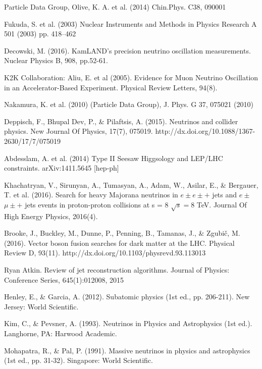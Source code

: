 \documentclass[11pt, oneside]{book}
\begin{document}
\begin{thebibliography}{10}

Particle Data Group, Olive, K. A. et al. (2014) Chin.Phys. C38, 090001 


 Fukuda, S. et al. (2003) Nuclear Instruments and Methods in Physics Research A 501 (2003) pp. 418–462

 Decowski, M. (2016). KamLAND's precision neutrino oscillation measurements. Nuclear Physics B, 908, pp.52-61.

 K2K Collaboration: Aliu, E. et al (2005). Evidence for Muon Neutrino Oscillation in an Accelerator-Based Experiment. Physical Review Letters, 94(8).

Nakamura, K. et al. (2010) (Particle Data Group), J. Phys. G 37, 075021 (2010) 

 Deppisch, F., Bhupal Dev, P., \& Pilaftsis, A. (2015). Neutrinos and collider physics. New Journal Of Physics, 17(7), 075019. http://dx.doi.org/10.1088/1367-2630/17/7/075019

 Abdesslam, A. et al. (2014) Type II Seesaw Higgsology and LEP/LHC constraints. arXiv:1411.5645 [hep-ph]

 Khachatryan, V., Sirunyan, A., Tumasyan, A., Adam, W., Asilar, E., \& Bergauer, T. et al. (2016). Search for heavy Majorana neutrinos in $e\pm e\pm +$ jets and $e\pm$ $\mu \pm +$ jets events in proton-proton collisions at s = 8 $\sqrt{s}=8$ TeV. Journal Of High Energy Physics, 2016(4).

 Brooke, J., Buckley, M., Dunne, P., Penning, B., Tamanas, J., \& Zgubič, M. (2016). Vector boson fusion searches for dark matter at the LHC. Physical Review D, 93(11). http://dx.doi.org/10.1103/physrevd.93.113013

 Ryan Atkin.  Review of jet reconstruction algorithms. Journal of Physics: Conference Series, 645(1):012008, 2015

 Henley, E., \& Garcia, A. (2012). Subatomic physics (1st ed., pp. 206-211). New Jersey: World Scientific.

 Kim, C., \& Pevsner, A. (1993). Neutrinos in Physics and Astrophysics (1st ed.). Langhorne, PA: Harwood Academic.

 Mohapatra, R., \& Pal, P. (1991). Massive neutrinos in physics and astrophysics (1st ed., pp. 31-32). Singapore: World Scientific.


\end{thebibliography}
\end{document}
